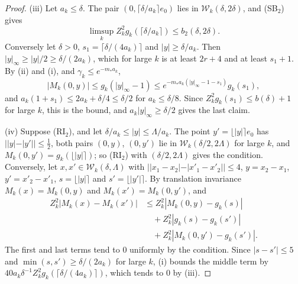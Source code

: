\documentclass[aps,prd,twocolumn,superscriptaddress,nofootinbib,longbibliography,floatfix,amsmath,amssymb,10pt]{revtex4-2}
\theoremstyle{definition}
\theoremstyle{remark}
\begin{document}
\begin{proof}
(iii) Let $a_k\le\delta$. The pair $(0,\lceil\delta/a_k\rceil e_0)$ lies in
$\mathcal W_k(\delta,2\delta)$, and (SB$_2$) gives
\[
\limsup_kZ_k^2g_k(\lceil\delta/a_k\rceil)\le b_2(\delta,2\delta).
\] Conversely let $\delta>0$,
$s_1=\lceil\delta/(4a_k)\rceil$ and $|y|\ge\delta/a_k$. Then $|y|_\infty\ge
|y|/2\ge\delta/(2a_k)$, which for large $k$ is at least $2r+4$ and at least
$s_1+1$. By (ii) and (i), and $\gamma_k\le e^{-m_*a_k}$,
\[
|M_k(0,y)|\le g_k(|y|_\infty-1)\le e^{-m_*a_k(|y|_\infty-1-s_1)}g_k(s_1),
\]
and $a_k(1+s_1)\le2a_k+\delta/4\le\delta/2$ for $a_k\le\delta/8$. Since
$Z_k^2g_k(s_1)\le b(\delta)+1$ for large $k$, this is the bound, and
$a_k|y|_\infty\ge\delta/2$ gives the last claim.

(iv) Suppose (RI$_2$), and let $\delta/a_k\le|y|\le\Lambda/a_k$. The point
$y'=\lfloor|y|\rceil e_0$ has $||y|-|y'||\le\frac12$, both pairs $(0,y)$,
$(0,y')$ lie in $\mathcal W_k(\delta/2,2\Lambda)$ for large $k$, and
$M_k(0,y')=g_k(\lfloor|y|\rceil)$; so (RI$_2$) with $(\delta/2,2\Lambda)$
gives the condition. Conversely, let $x,x'\in\mathcal W_k(\delta,\Lambda)$
with $||x_1-x_2|-|x'_1-x'_2||\le4$, $y=x_2-x_1$, $y'=x'_2-x'_1$,
$s=\lfloor|y|\rceil$ and $s'=\lfloor|y'|\rceil$. By translation invariance
$M_k(x)=M_k(0,y)$ and $M_k(x')=M_k(0,y')$, and
\[
\begin{split}
Z_k^2|M_k(x)-M_k(x')|&\le Z_k^2|M_k(0,y)-g_k(s)|\\
&\quad+Z_k^2|g_k(s)-g_k(s')|\\
&\quad+Z_k^2|M_k(0,y')-g_k(s')| .
\end{split}
\]
The first and last terms tend to $0$ uniformly by the condition. Since
$|s-s'|\le5$ and $\min(s,s')\ge\delta/(2a_k)$ for large $k$, (i) bounds the
middle term by $40a_k\delta^{-1}Z_k^2g_k(\lceil\delta/(4a_k)\rceil)$, which
tends to $0$ by (iii).


\end{proof}
\end{document}
